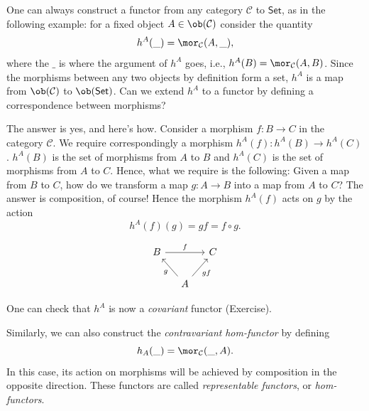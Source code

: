 \begin{example}\label{hom-functor example}
    \label{Representable functors} One can always construct a functor
    from any category $\mathcal{C}$ to $\mathsf{Set}$, as in the following
    example: for a fixed object $A\in\ob(\mathcal{C})$ consider the quantity
    \begin{equation}
    h^{A}(\_)=\mor_{\mathcal{C}}(A,\_),
    \end{equation}
    where the $\_$ is where the argument of $h^{A}$ goes, i.e., $h^{A}(B)=\mor_{\mathcal{C}}(A,B)$.
    Since the morphisms between any two objects by definition form a set,
    $h^{A}$ is a map from $\ob(\mathcal{C})$ to $\ob(\mathsf{Set})$.
    Can we extend $h^{A}$ to a functor by defining a correspondence between
    morphisms? 

    The answer is yes, and here's how. Consider a morphism $f:B\rightarrow C$ in the category $\mathcal{C}$.
    We require correspondingly a morphism $h^{A}(f):h^{A}(B)\rightarrow h^{A}(C)$.
    $h^{A}(B)$ is the set of morphisms from $A$ to $B$ and $h^{A}(C)$ is
    the set of morphisms from $A$ to $C$. Hence, what we require is the following:
    Given a map from $B$ to $C$, how do we transform a map $g:A\rightarrow B$
    into a map from $A$ to $C$? The answer is composition, of course! Hence the morphism $h^{A}(f)$ acts on $g$ by the action
    \begin{equation}
    h^{A}(f)(g)=gf=f\circ g.
    \end{equation}

    \begin{equation}
    \begin{tikzcd}[column sep=small] 
    B \arrow[rr, "f"] & & C\\
    & A \arrow[lu, "g"] \arrow[ru, "gf"'] & 
    \end{tikzcd}
    \end{equation}

    One can check that $h^{A}$ is now a \emph{covariant} functor (Exercise).

    Similarly, we can also construct the \emph{contravariant} \emph{hom-functor}
    by defining\begin{equation} 
    h_A(\_) = \mor_\mathcal{C}(\_, A). 
    \end{equation} In this case, its action on morphisms will be achieved by composition
    in the opposite direction. These functors are called \emph{representable
    functors}, or \emph{hom-functors}.
\end{example}
